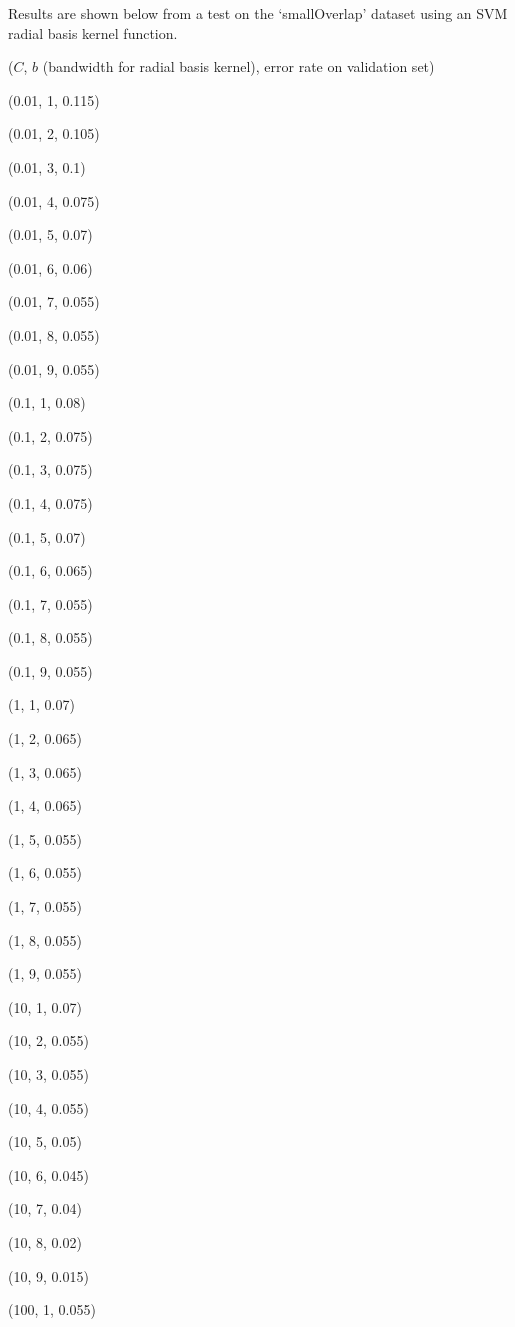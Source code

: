 \documentclass{paper}
\begin{document}
\begin{enumerate}
    Results are shown below from a test on the `smallOverlap' dataset using an SVM radial basis kernel function.

    ($C$, $b$ (bandwidth for radial basis kernel), error rate on validation set)
    
    (0.01, 1, 0.115)
    
    (0.01, 2, 0.105)
    
    (0.01, 3, 0.1)
    
    (0.01, 4, 0.075)
    
    (0.01, 5, 0.07)
    
    (0.01, 6, 0.06)
    
    (0.01, 7, 0.055)
    
    (0.01, 8, 0.055)
    
    (0.01, 9, 0.055)
    
    (0.1, 1, 0.08)
    
    (0.1, 2, 0.075)
    
    (0.1, 3, 0.075)
    
    (0.1, 4, 0.075)
    
    (0.1, 5, 0.07)
    
    (0.1, 6, 0.065)
    
    (0.1, 7, 0.055)
    
    (0.1, 8, 0.055)
    
    (0.1, 9, 0.055)
    
    (1, 1, 0.07)
    
    (1, 2, 0.065)
    
    (1, 3, 0.065)
    
    (1, 4, 0.065)
    
    (1, 5, 0.055)
    
    (1, 6, 0.055)
    
    (1, 7, 0.055)
    
    (1, 8, 0.055)
    
    (1, 9, 0.055)
    
    (10, 1, 0.07)
    
    (10, 2, 0.055)
    
    (10, 3, 0.055)
    
    (10, 4, 0.055)
    
    (10, 5, 0.05)
    
    (10, 6, 0.045)
    
    (10, 7, 0.04)
    
    (10, 8, 0.02)
    
    (10, 9, 0.015)
    
    (100, 1, 0.055)
    

\end{enumerate}
\end{document}
